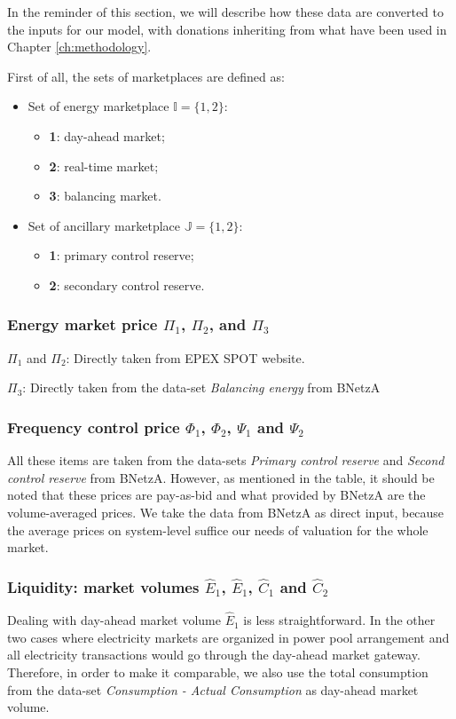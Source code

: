 In the reminder of this section, we will describe how these data are converted to the inputs for our model, with donations inheriting from what have been used in Chapter \ref{ch:methodology}.

First of all, the sets of marketplaces are defined as:

\begin{itemize}
	\item Set of energy marketplace $\mathbb{I} = \{1,2\}$:
	\begin{itemize}
		\item \textbf{1}: day-ahead market;
		\item \textbf{2}: real-time market;
		\item \textbf{3}: balancing market.
	\end{itemize}
	\item Set of ancillary marketplace $\mathbb{J}=\{1,2\}$:
	\begin{itemize}
		\item \textbf{1}: primary control reserve;
		\item \textbf{2}: secondary control reserve.
	\end{itemize}
\end{itemize}

\subsubsection{Energy market price $\Pi_1$, $\Pi_2$, and $\Pi_3$}

$\Pi_1$ and $\Pi_2$: Directly taken from EPEX SPOT website.

$\Pi_3$:
Directly taken from the data-set \textit{Balancing energy} from BNetzA

\subsubsection{Frequency control price $\Phi_1$, $\Phi_2$, $\Psi_1$ and $\Psi_2$}

All these items are taken from the data-sets \textit{Primary control reserve} and \textit{Second control reserve} from BNetzA. However, as mentioned in the table, it should be noted that these prices are pay-as-bid and what provided by BNetzA are the volume-averaged prices. We take the data from BNetzA as direct input, because the average prices on system-level suffice our needs of valuation for the whole market.

\subsubsection{Liquidity: market volumes $\hat{E}_1$, $\hat{E}_1$, $\hat{C}_1$ and $\hat{C}_2$}
Dealing with day-ahead market volume $\hat{E}_1$ is less straightforward. In the other two cases where electricity markets are organized in power pool arrangement and all electricity transactions would go through the day-ahead market gateway. Therefore, in order to make it comparable, we also use the total consumption from the data-set \textit{Consumption - Actual Consumption} as day-ahead market volume.

